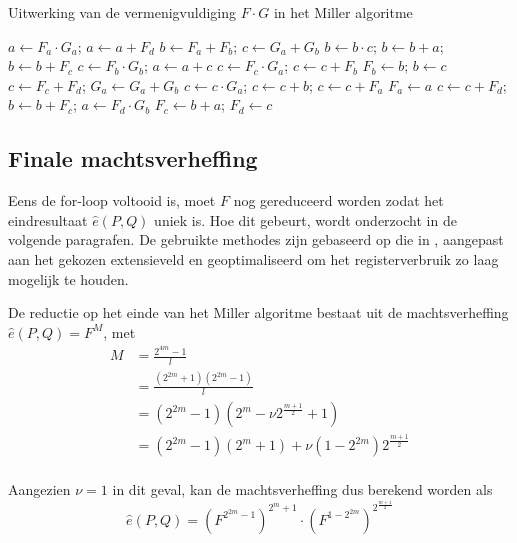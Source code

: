 \begin{algorithm}[h]
	\caption{Uitwerking van de vermenigvuldiging $F \cdot G$ in het Miller algoritme}
	\label{algoritme-implementatie-miller-fg}
	$a \gets F_a \cdot G_a$; $a \gets a + F_d$\;
	$b \gets F_a + F_b$; $c \gets G_a + G_b$\;
	$b \gets b \cdot c$; $b \gets b + a$; $b \gets b + F_c$\;
	$c \gets F_b \cdot G_b$; $a \gets a + c$\;
	$c \gets F_c \cdot G_a$;	$c \gets c + F_b$\;
	$F_b \gets b$; $b \gets c$\;
	$c \gets F_c + F_d$; $G_a \gets G_a + G_b$\;
	$c \gets c \cdot G_a$; $c \gets c + b$; $c \gets c + F_a$\;
	$F_a \gets a$\;
	$c \gets c + F_d$; $b \gets b + F_c$; $a \gets F_d \cdot G_b$\;
	$F_c \gets b + a$; $F_d \gets c$\;
\end{algorithm}

\subsection{Finale machtsverheffing\label{subsectie-implementatie-miller-finale-exp}}

Eens de for-loop voltooid is, moet $F$ nog gereduceerd worden zodat het eindresultaat $\hat{e}(P, Q)$ uniek is. Hoe dit gebeurt, wordt onderzocht in de volgende paragrafen. De gebruikte methodes zijn gebaseerd op die in \cite{beuchat}, aangepast aan het gekozen extensieveld en geoptimaliseerd om het registerverbruik zo laag mogelijk te houden.

De reductie op het einde van het Miller algoritme bestaat uit de machtsverheffing $\hat{e}(P, Q) = F^M$, met
\[\begin{aligned}
M	&= \frac{2^{4m} - 1}{l}\\
	&= \frac{(2^{2m} + 1)(2^{2m} - 1)}{l}\\
	&= (2^{2m} - 1)(2^m - \nu 2^{\frac{m + 1}{2}} + 1)\\
	&= (2^{2m} - 1)(2^m + 1) + \nu(1 - 2^{2m})2^{\frac{m + 1}{2}}\\
\end{aligned}\]

Aangezien $\nu = 1$ in dit geval, kan de machtsverheffing dus berekend worden als
\[\hat{e}(P, Q) = \left(F^{2^{2m} - 1}\right)^{2^m + 1} \cdot \left(F^{1 - 2^{2m}}\right)^{2^{\frac{m + 1}{2}}}\]

